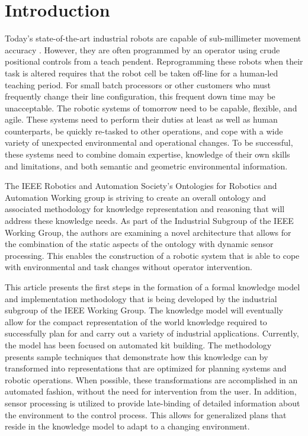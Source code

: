 \documentclass[preprint,12pt]{elsarticle}
\begin{document}

\section{Introduction}
\label{sect:introduction}
Today's state-of-the-art industrial robots are capable of sub-millimeter movement accuracy \cite{RobotAccuracy}.
However, they are often programmed by an operator using crude positional controls from a teach pendent. 
Reprogramming these robots when their task is altered requires that the robot cell be taken off-line for a
human-led teaching period.  For small batch processors or other customers who must frequently change
their line configuration, this frequent down time may be unacceptable. 
The robotic systems of tomorrow
need to be capable, flexible, and agile.  These systems need to perform their duties at least 
as well as human counterparts, be quickly re-tasked to other operations,
and cope with a wide variety of unexpected environmental and operational changes. 
To be successful, these systems need to combine domain expertise,
knowledge of their own skills and limitations, and both semantic and geometric environmental information.

The IEEE Robotics and Automation Society's Ontologies for Robotics and Automation Working group is 
striving to create an overall ontology and
associated methodology for knowledge representation and reasoning that will address these 
knowledge needs. As part of the
Industrial Subgroup of the IEEE Working Group, the authors are examining a novel 
architecture that allows for the combination of the static
aspects of the ontology with dynamic sensor processing. This enables the construction of a robotic 
system that 
is able to cope with environmental and task changes
without operator intervention.

This article presents the first steps in the formation of a formal knowledge model and implementation methodology
that is being developed by the industrial subgroup
of the IEEE Working Group. The knowledge model will eventually allow for the compact representation
of the world knowledge required to successfully plan for and carry out a variety of industrial applications. Currently,
the model has been focused on automated kit building.
The methodology presents sample techniques that demonstrate how this knowledge can by transformed
into representations that are optimized for planning systems and robotic operations. When possible,
these transformations are accomplished in an automated fashion, without the need for intervention from
the user. In addition, sensor processing is utilized to provide late-binding of detailed information
about the environment to the control process. This allows for generalized plans that reside in the knowledge
model to adapt to a changing environment.
\end{document}
